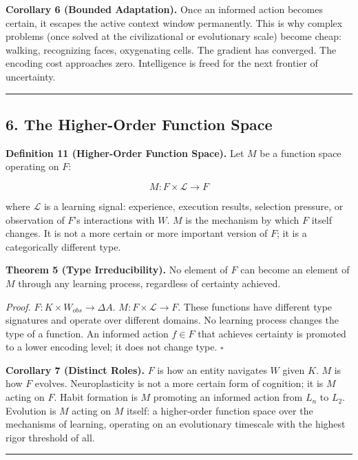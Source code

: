 \documentclass[
]{article}
\begin{document}
\textbf{Corollary 6 (Bounded Adaptation).} Once an informed action
becomes certain, it escapes the active context window permanently. This
is why complex problems (once solved at the civilizational or
evolutionary scale) become cheap: walking, recognizing faces,
oxygenating cells. The gradient has converged. The encoding cost
approaches zero. Intelligence is freed for the next frontier of
uncertainty.

\begin{center}\rule{0.5\linewidth}{0.5pt}\end{center}

\subsection{6. The Higher-Order Function
Space}\label{the-higher-order-function-space}

\textbf{Definition 11 (Higher-Order Function Space).} Let \(M\) be a
function space operating on \(F\):

\[M : F \times \mathcal{L} \rightarrow F\]

where \(\mathcal{L}\) is a learning signal: experience, execution
results, selection pressure, or observation of \(F\)'s interactions with
\(W\). \(M\) is the mechanism by which \(F\) itself changes. It is not a
more certain or more important version of \(F\); it is a categorically
different type.

\textbf{Theorem 5 (Type Irreducibility).} No element of \(F\) can become
an element of \(M\) through any learning process, regardless of
certainty achieved.

\emph{Proof.} \(F : K \times W_{obs} \rightarrow \Delta A\).
\(M : F \times \mathcal{L} \rightarrow F\). These functions have
different type signatures and operate over different domains. No
learning process changes the type of a function. An informed action
\(f \in F\) that achieves certainty is promoted to a lower encoding
level; it does not change type. \(\square\)

\textbf{Corollary 7 (Distinct Roles).} \(F\) is how an entity navigates
\(W\) given \(K\). \(M\) is how \(F\) evolves. Neuroplasticity is not a
more certain form of cognition; it is \(M\) acting on \(F\). Habit
formation is \(M\) promoting an informed action from \(L_n\) to \(L_2\).
Evolution is \(M\) acting on \(M\) itself: a higher-order function space
over the mechanisms of learning, operating on an evolutionary timescale
with the highest rigor threshold of all.

\begin{center}\rule{0.5\linewidth}{0.5pt}\end{center}
\end{document}
